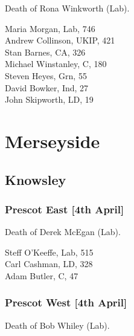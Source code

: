 \documentclass[a4paper,openany,10pt]{book}
\begin{document}

Death of Rona Winkworth (Lab).



Maria Morgan, Lab, 746\\
Andrew Collinson, UKIP, 421\\
Stan Barnes, CA, 326\\
Michael Winstanley, C, 180\\
Steven Heyes, Grn, 55\\
David Bowker, Ind, 27\\
John Skipworth, LD, 19\\


\vfill

\section{Merseyside}

\subsection*{Knowsley}

\subsubsection*{Prescot East \hspace*{\fill}\nolinebreak[1]%
\enspace\hspace*{\fill}
[4th April]}


Death of Derek McEgan (Lab).



Steff O'Keeffe, Lab, 515\\
Carl Cashman, LD, 328\\
Adam Butler, C, 47\\


\subsubsection*{Prescot West \hspace*{\fill}\nolinebreak[1]%
\enspace\hspace*{\fill}
[4th April]}


Death of Bob Whiley (Lab).
\end{document}
